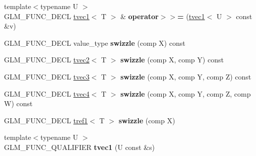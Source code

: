 \begin{DoxyCompactItemize}
\item 
\hypertarget{structglm_1_1detail_1_1tvec1_a370fd88fbbcb8ac5db473ad3fdb4b7e9}{{\footnotesize template$<$typename U $>$ }\\G\-L\-M\-\_\-\-F\-U\-N\-C\-\_\-\-D\-E\-C\-L \hyperlink{structglm_1_1detail_1_1tvec1}{tvec1}$<$ T $>$ \& {\bfseries operator$>$$>$=} (\hyperlink{structglm_1_1detail_1_1tvec1}{tvec1}$<$ U $>$ const \&v)}\label{structglm_1_1detail_1_1tvec1_a370fd88fbbcb8ac5db473ad3fdb4b7e9}

\item 
\hypertarget{structglm_1_1detail_1_1tvec1_ab258e2d7ca9feea296fdba45aa08506f}{G\-L\-M\-\_\-\-F\-U\-N\-C\-\_\-\-D\-E\-C\-L value\-\_\-type {\bfseries swizzle} (comp X) const }\label{structglm_1_1detail_1_1tvec1_ab258e2d7ca9feea296fdba45aa08506f}

\item 
\hypertarget{structglm_1_1detail_1_1tvec1_a5e7f3cadec820ede79ba60558fd997f0}{G\-L\-M\-\_\-\-F\-U\-N\-C\-\_\-\-D\-E\-C\-L \hyperlink{structglm_1_1detail_1_1tvec2}{tvec2}$<$ T $>$ {\bfseries swizzle} (comp X, comp Y) const }\label{structglm_1_1detail_1_1tvec1_a5e7f3cadec820ede79ba60558fd997f0}

\item 
\hypertarget{structglm_1_1detail_1_1tvec1_ac2fe43138ea25472a08647229124b1d1}{G\-L\-M\-\_\-\-F\-U\-N\-C\-\_\-\-D\-E\-C\-L \hyperlink{structglm_1_1detail_1_1tvec3}{tvec3}$<$ T $>$ {\bfseries swizzle} (comp X, comp Y, comp Z) const }\label{structglm_1_1detail_1_1tvec1_ac2fe43138ea25472a08647229124b1d1}

\item 
\hypertarget{structglm_1_1detail_1_1tvec1_a2543087488c26f83e20b92b55977e0fb}{G\-L\-M\-\_\-\-F\-U\-N\-C\-\_\-\-D\-E\-C\-L \hyperlink{structglm_1_1detail_1_1tvec4}{tvec4}$<$ T $>$ {\bfseries swizzle} (comp X, comp Y, comp Z, comp W) const }\label{structglm_1_1detail_1_1tvec1_a2543087488c26f83e20b92b55977e0fb}

\item 
\hypertarget{structglm_1_1detail_1_1tvec1_a6237f003a2637aa33f6912f83ca80e20}{G\-L\-M\-\_\-\-F\-U\-N\-C\-\_\-\-D\-E\-C\-L \hyperlink{structglm_1_1detail_1_1tref1}{tref1}$<$ T $>$ {\bfseries swizzle} (comp X)}\label{structglm_1_1detail_1_1tvec1_a6237f003a2637aa33f6912f83ca80e20}

\item 
\hypertarget{structglm_1_1detail_1_1tvec1_a0d0c075c449b4e8933cc18262a78e857}{{\footnotesize template$<$typename U $>$ }\\G\-L\-M\-\_\-\-F\-U\-N\-C\-\_\-\-Q\-U\-A\-L\-I\-F\-I\-E\-R {\bfseries tvec1} (U const \&s)}\label{structglm_1_1detail_1_1tvec1_a0d0c075c449b4e8933cc18262a78e857}


\end{DoxyCompactItemize}
